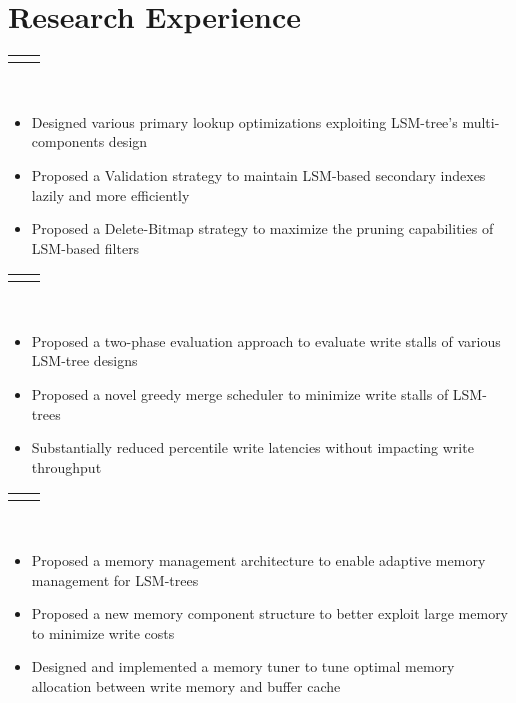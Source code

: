 \documentclass[11pt,a4paper,roman]{moderncv}        %
\makeatletter
\newcommand{\reduce}{\vspace{-0.115in}}
\newcommand{\cvexpr}[5][1em]{
  \begin{tabular*}{\maincolumnwidth}{l@{\extracolsep{\fill}}r}%
    {\textbf{#3}\ifthenelse{\equal{#3}{}}{\textbf{#4}}{, #4}} & {\itshape#2}%
  \end{tabular*}%
  \\
  \begin{minipage}{\maincolumnwidth}%
        #5%
  \end{minipage}%
  \par\addvspace{#1}
}
\makeatother
\begin{document}
\section{Research Experience}
\vspace{-0.05in}
\cvexpr{}{}{Efficient Maintenance and Exploitation of LSM-based auxiliary structures [PVLDB'19]}{
\begin{itemize}
	\item Designed various primary lookup optimizations exploiting LSM-tree's multi-components design
	\item Proposed a Validation strategy to maintain LSM-based secondary indexes lazily and more efficiently
	\item Proposed a Delete-Bitmap strategy to maximize the pruning capabilities of LSM-based filters
\end{itemize}
}
\reduce
\cvexpr{}{}{Minimizing LSM-tree's Write Stalls via Novel Merge Scheduling [PVLDB'20]}{
	\begin{itemize}
		\item Proposed a two-phase evaluation approach to evaluate write stalls of various LSM-tree designs
		\item Proposed a novel greedy merge scheduler to minimize write stalls of LSM-trees
		\item Substantially reduced percentile write latencies without impacting write throughput
	\end{itemize}
}
\reduce
\cvexpr{}{}{Adaptive Memory Management of LSM-trees [Under Submission]}{
	\begin{itemize}
		\item Proposed a memory management architecture to enable adaptive memory management for LSM-trees
		\item Proposed a new memory component structure to better exploit large memory to minimize write costs
		\item Designed and implemented a memory tuner to tune optimal memory allocation between write memory and buffer cache
	\end{itemize}
}

\reduce
\reduce
\end{document}
